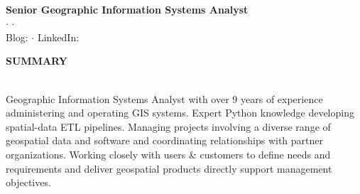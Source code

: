\documentclass[letterpaper]{article}
\newcommand{\lineunder} {
        \vspace*{-8pt} \\
        \hspace*{-18pt} \hrulefill \\
    }
\newcommand{\header} [1] {
        \vspace{9pt}
        {\hspace*{-18pt}\vspace*{6pt} \large \textbf {#1}}
        \vspace*{-6pt} \lineunder
        \vspace{2pt}
    }
\newcommand{\cvprofile}[7]{ %
        \begin{center}
            {\Huge \textbf {#1}}\\
            \vspace{4pt}
            {\large \textbf {#2}}\\
            \vspace{4pt}
            #3 $\cdot$\enspace #4 $\cdot$\enspace #5\\
            Blog: #6
            $\cdot$\enspace
            LinkedIn: #7
        \end{center}
    }
\newcommand{\CVjobTitle}{Senior Geographic Information Systems Analyst}
\begin{document}



\vspace*{-30pt}

\cvprofile
    {\CVname}
    {\CVjobTitle}
    {\CVaddress}
    {\CVemail}
    {\CVphone}
    {\CVblogurl}
    {\CVlinkedin}

\vspace*{-6pt}



\header{SUMMARY}
Geographic Information Systems Analyst with over 9 years of experience administering and operating GIS systems.
Expert Python knowledge developing spatial-data ETL pipelines.
Managing projects involving a diverse range of geospatial data and software and coordinating relationships with partner organizations.
Working closely with users \& customers to define needs and requirements
and deliver geospatial products directly support management objectives.

\end{document}

